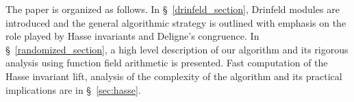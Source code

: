 \documentclass{article}
\theoremstyle{plain}
\theoremstyle{definition}
\def\F{\ensuremath{\mathbb{F}}}
\begin{document}
\noindent The paper is organized as follows. In \S~\ref{drinfeld_section}, Drinfeld modules are introduced and the general algorithmic strategy is outlined with emphasis on the role played by Hasse invariants and Deligne's congruence. In \S~\ref{randomized_section}, a high level description of our algorithm and its rigorous analysis using function field arithmetic is presented. Fast computation of the Hasse invariant lift, analysis of the complexity of the algorithm and its practical implications are in \S~\ref{sec:hasse}. 
\end{document}
